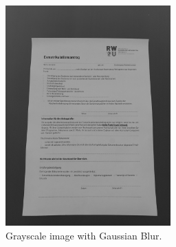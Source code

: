 \documentclass[twocolumn,10pt]{asme2ej}
\begin{document}
\begin{figure}[H]
    \centerline{\includegraphics[width=2.5in]{output/hoch_3_3_gaussianblur.jpg}}
    \caption{Grayscale image with Gaussian Blur.}
    \label{fig:grayscale}
\end{figure}

\end{document}
